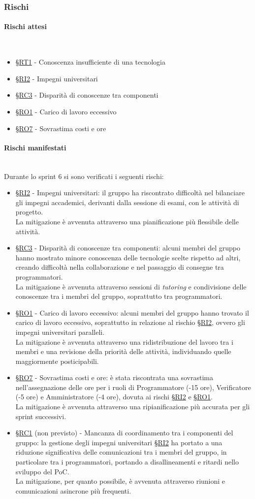 \documentclass[10pt, letterpaper]{article}
\newcommand{\trisubsection}[1]{\paragraph{#1}\mbox{}\\}
\newcommand{\rif}[1]{\hyperref[#1]{§#1}}
\begin{document}
\subsubsection{Rischi}
\trisubsection{Rischi attesi}
\begin{itemize}
    \item \rif{RT1} - Conoscenza insufficiente di una tecnologia
    \item \rif{RI2} - Impegni universitari
    \item \rif{RC3} - Disparità di conoscenze tra componenti
    \item \rif{RO1} - Carico di lavoro eccessivo
    \item \rif{RO7} - Sovrastima costi e ore
\end{itemize}
\trisubsection{Rischi manifestati}
Durante lo sprint 6 si sono verificati i seguenti rischi:
\begin{itemize}
    \item \rif{RI2} - Impegni universitari: il gruppo ha riscontrato difficoltà nel bilanciare gli impegni accademici, derivanti dalla sessione di esami, con le attività di progetto.
          \\La mitigazione è avvenuta attraverso una pianificazione più flessibile delle attività.
    \item \rif{RC3} - Disparità di conoscenze tra componenti: alcuni membri del gruppo hanno mostrato minore conoscenza delle tecnologie scelte rispetto ad altri, creando difficoltà nella collaborazione e nel passaggio di consegne tra programmatori.
          \\La mitigazione è avvenuta attraverso sessioni di \textit{tutoring} e condivisione delle conoscenze tra i membri del gruppo, soprattutto tra programmatori.
    \item \rif{RO1} - Carico di lavoro eccessivo: alcuni membri del gruppo hanno trovato il carico di lavoro eccessivo, soprattutto in relazione al rischio \rif{RI2}, ovvero gli impegni universitari paralleli.
          \\La mitigazione è avvenuta attraverso una ridistribuzione del lavoro tra i membri e una revisione della priorità delle attività, individuando quelle maggiormente posticipabili.
    \item \rif{RO7} - Sovrastima costi e ore: è stata riscontrata una sovrastima nell'assegnazione delle ore per i ruoli di Programmatore (-15 ore), Verificatore (-5 ore) e Amministratore (-4 ore), dovuta ai rischi \rif{RI2} e \rif{RO1}.
          \\La mitigazione è avvenuta attraverso una ripianificazione più accurata per gli sprint successivi.
    \item \rif{RC1} (non previsto) - Mancanza di coordinamento tra i componenti del gruppo: la gestione degli impegni universitari \rif{RI2} ha portato a una riduzione significativa delle comunicazioni tra i membri del gruppo, in particolare tra i programmatori, portando a disallineamenti e ritardi nello sviluppo del PoC.
          \\La mitigazione, per quanto possibile, è avvenuta attraverso riunioni e comunicazioni asincrone più frequenti.
\end{itemize}
\end{document}
